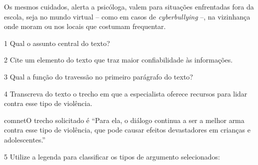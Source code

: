 {\begin{myquote}
Os mesmos cuidados, alerta a psicóloga, valem para situações enfrentadas
fora da escola, seja no mundo virtual -- como em casos de \textit{cyberbullying}
--, na vizinhança onde moram ou nos locais que costumam frequentar.

\end{myquote}


\num{1} Qual o assunto central do texto?


\num{2} Cite um elemento do texto que traz maior confiabilidade às informações.


\num{3} Qual a função do travessão no primeiro parágrafo do texto?


\num{4} Transcreva do texto o trecho em que a especialista oferece recursos
para lidar contra esse tipo de violência. 

comnet{O trecho solicitado é ``Para ela, o diálogo continua a ser a melhor
arma contra esse tipo de violência, que pode causar efeitos devastadores em
crianças e adolescentes.''}

\num{5} Utilize a legenda para classificar os tipos de argumento selecionados:

}
